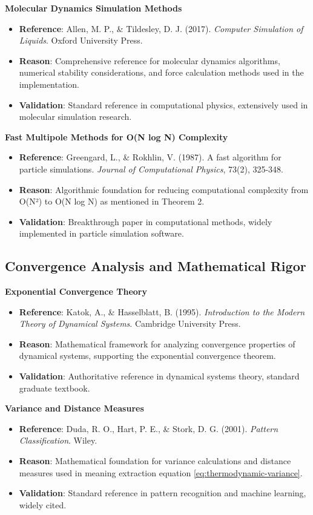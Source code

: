 \textbf{Molecular Dynamics Simulation Methods}
\begin{itemize}
\item \textbf{Reference}: Allen, M. P., \& Tildesley, D. J. (2017). \textit{Computer Simulation of Liquids}. Oxford University Press.
\item \textbf{Reason}: Comprehensive reference for molecular dynamics algorithms, numerical stability considerations, and force calculation methods used in the implementation.
\item \textbf{Validation}: Standard reference in computational physics, extensively used in molecular simulation research.
\end{itemize}

\textbf{Fast Multipole Methods for O(N log N) Complexity}
\begin{itemize}
\item \textbf{Reference}: Greengard, L., \& Rokhlin, V. (1987). A fast algorithm for particle simulations. \textit{Journal of Computational Physics}, 73(2), 325-348.
\item \textbf{Reason}: Algorithmic foundation for reducing computational complexity from O(N²) to O(N log N) as mentioned in Theorem 2.
\item \textbf{Validation}: Breakthrough paper in computational methods, widely implemented in particle simulation software.
\end{itemize}

\subsection{Convergence Analysis and Mathematical Rigor}

\textbf{Exponential Convergence Theory}
\begin{itemize}
\item \textbf{Reference}: Katok, A., \& Hasselblatt, B. (1995). \textit{Introduction to the Modern Theory of Dynamical Systems}. Cambridge University Press.
\item \textbf{Reason}: Mathematical framework for analyzing convergence properties of dynamical systems, supporting the exponential convergence theorem.
\item \textbf{Validation}: Authoritative reference in dynamical systems theory, standard graduate textbook.
\end{itemize}

\textbf{Variance and Distance Measures}
\begin{itemize}
\item \textbf{Reference}: Duda, R. O., Hart, P. E., \& Stork, D. G. (2001). \textit{Pattern Classification}. Wiley.
\item \textbf{Reason}: Mathematical foundation for variance calculations and distance measures used in meaning extraction equation \ref{eq:thermodynamic-variance}.
\item \textbf{Validation}: Standard reference in pattern recognition and machine learning, widely cited.
\end{itemize}

